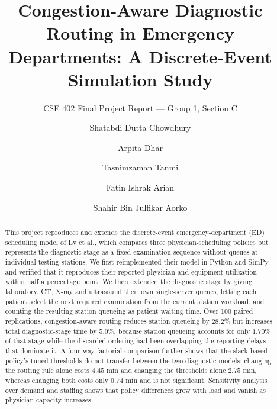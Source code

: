 \documentclass[sigconf]{acmart}
\begin{document}
\title{Congestion-Aware Diagnostic Routing in Emergency Departments:
A Discrete-Event Simulation Study}
\subtitle{CSE 402 Final Project Report --- Group 1, Section C}

\author{Shatabdi Dutta Chowdhury}

\author{Arpita Dhar}

\author{Tasnimzaman Tanmi}

\author{Fatin Ishrak Arian}

\author{Shahir Bin Julfikar Aorko}

\renewcommand{\shortauthors}{Chowdhury et al.}

\begin{abstract}
This project reproduces and extends the discrete-event emergency-department
(ED) scheduling model of Lv et al., which compares three physician-scheduling
policies but represents the diagnostic stage as a fixed examination sequence
without queues at individual testing stations. We first reimplemented their
model in Python and SimPy and verified that it reproduces their reported
physician and equipment utilization within half a percentage point. We then
extended the diagnostic stage by giving laboratory, CT, X-ray and ultrasound
their own single-server queues, letting each patient select the next required
examination from the current station workload, and counting the resulting
station queueing as patient waiting time. Over 100 paired replications,
congestion-aware routing reduces station queueing by $28.2\%$ but increases
total diagnostic-stage time by $5.0\%$, because station queueing accounts for
only $1.70\%$ of that stage while the discarded ordering had been overlapping
the reporting delays that dominate it. A four-way factorial comparison further
shows that the slack-based policy's tuned thresholds do not transfer between
the two diagnostic models: changing the routing rule alone costs $4.45$ min and
changing the thresholds alone $2.75$ min, whereas changing both costs only
$0.74$ min and is not significant. Sensitivity analysis over demand and
staffing shows that policy differences grow with load and vanish as physician
capacity increases.
\end{abstract}
\end{document}
